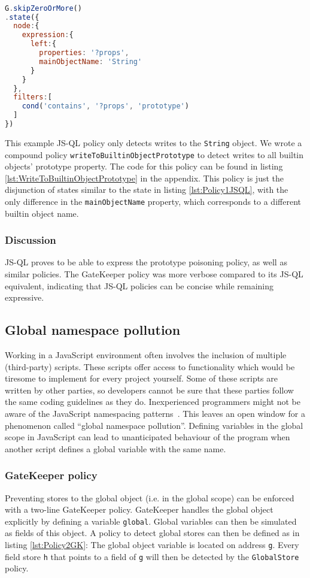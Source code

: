 \begin{lstlisting}[label={lst:Policy1JSQL},language=JavaScript,caption=Policy 1 in JS-QL,mathescape=true]  % float=t?

G.skipZeroOrMore()
.state({
  node:{
    expression:{
      left:{
        properties: '?props',
        mainObjectName: 'String'
      }
    }
  },
  filters:[
    cond('contains', '?props', 'prototype')
  ]
})

\end{lstlisting}

This example JS-QL policy only detects writes to the \texttt{String} object. We wrote a compound policy \texttt{writeToBuiltinObjectPrototype} to detect writes to all builtin objects' prototype property. The code for this policy can be found in listing \ref{lst:WriteToBuiltinObjectPrototype} in the appendix. This policy is just the disjunction of states similar to the state in listing \ref{lst:Policy1JSQL}, with the only difference in the \texttt{mainObjectName} property, which corresponds to a different builtin object name.

\subsubsection*{Discussion}
JS-QL proves to be able to express the prototype poisoning policy, as well as similar policies. The GateKeeper policy was more verbose compared to its JS-QL equivalent, indicating that JS-QL policies can be concise while remaining expressive.


\subsection{Global namespace pollution}


Working in a JavaScript environment often involves the inclusion of multiple (third-party) scripts. These scripts offer access to functionality which would be tiresome to implement for every project yourself. Some of these scripts are written by other parties, so developers cannot be sure that these parties follow the same coding guidelines as they do. Inexperienced programmers might not be aware of the JavaScript namespacing patterns~\cite{JSNamespacing}. This leaves an open window for a phenomenon called ``global namespace pollution''. Defining variables in the global scope in JavaScript can lead to unanticipated behaviour of the program when another script defines a global variable with the same name.

\subsubsection*{GateKeeper policy}
Preventing stores to the global object (i.e. in the global scope) can be enforced with a two-line GateKeeper policy. GateKeeper handles the global object explicitly by defining a variable \texttt{global}. Global variables can then be simulated as fields of this object. A policy to detect global stores can then be defined as in listing \ref{lst:Policy2GK}: The global object variable is located on address \texttt{g}. Every field store \texttt{h} that points to a field of \texttt{g} will then be detected by the \texttt{GlobalStore} policy.

